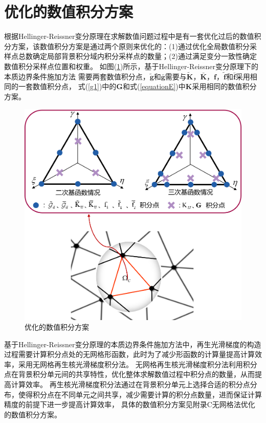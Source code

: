 \section{优化的数值积分方案}
根据Hellinger-Reissner变分原理在求解数值问题过程中是有一套优化过后的数值积分方案\cite{wang2019}，该数值积分方案是通过两个原则来优化的：(1)通过优化全局数值积分采样点总数确定局部背景积分域内积分采样点的数量；(2)通过满足变分一致性确定数值积分采样点位置和权重。
如图(\ref{Eintegralscheme})所示，基于Hellinger-Reissner变分原理下的本质边界条件施加方法
需要两套数值积分点，$\tilde{\pmb g}$和$\bar{\pmb g}$需要与$\tilde{\pmb{K}}$，$\bar{\pmb{K}}$，$\pmb{f}$，$\tilde{\pmb{f}}$和$\bar{\pmb{f}}$采用相同的一套数值积分点，
式(\ref{g1})中的$\pmb{G}$和式(\ref{equationE})中$\pmb{K}$采用相同的数值积分方案。\par
\begin{figure}[H]
    \centering
    \includegraphics[scale=0.6]{figure/EHR/Eintegralscheme.png}
    \caption{优化的数值积分方案}\label{Eintegralscheme}
\end{figure}
基于Hellinger-Reissner变分原理的本质边界条件施加方法中，再生光滑梯度的构造过程需要计算积分点处的无网格形函数，此时为了减少形函数的计算量提高计算效率，采用无网格再生核光滑梯度积分法。
无网格再生核光滑梯度积分法利用积分点在背景积分单元间的共享特性，优化整体求解数值过程中积分点的数量，从而提高计算效率。
再生核光滑梯度积分法通过在背景积分单元上选择合适的积分点分布，使得积分点在不同单元之间共享，减少需要计算的积分点数量，进而保证计算精度的前提下进一步提高计算效率，
具体的数值积分方案见附录C无网格法优化的数值积分方案。
